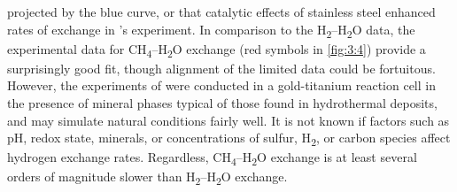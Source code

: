 projected by the blue curve, or that catalytic effects of stainless
steel enhanced rates of exchange in \citeauthor{Lyon+Hulston_1984_GCA}'s experiment. In
comparison to the H\textsubscript{2}--H\textsubscript{2}O data, the
experimental data for CH\textsubscript{4}--H\textsubscript{2}O exchange
(red symbols in \autoref{fig:3:4}) provide a surprisingly good fit, though
alignment of the limited data could be fortuitous. However, the
experiments of \textcite{Reeves++_2012_GCA} were conducted in a gold-titanium
reaction cell in the presence of mineral phases typical of those found
in hydrothermal deposits, and may simulate natural conditions fairly
well. It is not known if factors such as pH, redox state, minerals, or
concentrations of sulfur, H\textsubscript{2}, or carbon species affect
hydrogen exchange rates. Regardless,
CH\textsubscript{4}--H\textsubscript{2}O exchange is at least several
orders of magnitude slower than H\textsubscript{2}--H\textsubscript{2}O
exchange.
\renewcommand{\textfraction}{0.2}
\renewcommand{\floatpagefraction}{0.6}

